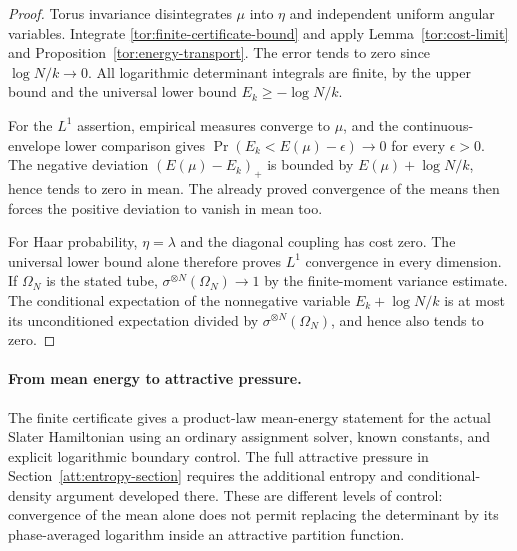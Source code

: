 \begin{proof}
Torus invariance disintegrates $\mu$ into $\eta$ and independent uniform
angular variables. Integrate \eqref{tor:finite-certificate-bound} and
apply Lemma~\ref{tor:cost-limit} and
Proposition~\ref{tor:energy-transport}. The error tends to zero since
$\log N/k\to0$. All logarithmic determinant integrals are finite, by
the upper bound and the universal lower bound $E_k\ge-\log N/k$.

For the $L^1$ assertion, empirical measures converge to $\mu$, and the
continuous-envelope lower comparison gives
$\Pr(E_k<E(\mu)-\epsilon)\to0$ for every $\epsilon>0$.
The negative deviation $(E(\mu)-E_k)_+$ is bounded by
$E(\mu)+\log N/k$, hence tends to zero in mean. The already proved
convergence of the means then forces the positive deviation to vanish
in mean too.

For Haar probability, $\eta=\lambda$ and the diagonal coupling has
cost zero. The universal lower bound alone therefore proves $L^1$
convergence in every dimension. If $\Omega_N$ is the stated tube,
$\sigma^{\otimes N}(\Omega_N)\to1$ by the finite-moment variance
estimate. The conditional expectation of the nonnegative variable
$E_k+\log N/k$ is at most its unconditioned expectation divided by
$\sigma^{\otimes N}(\Omega_N)$, and hence also tends to zero.
\end{proof}

\paragraph{From mean energy to attractive pressure.}
The finite certificate gives a product-law mean-energy statement for the
actual Slater Hamiltonian using an ordinary assignment solver, known
constants, and explicit logarithmic boundary control. The full attractive
pressure in Section~\ref{att:entropy-section} requires the additional
entropy and conditional-density argument developed there. These are
different levels of control: convergence of the mean alone does not
permit replacing the determinant by its phase-averaged logarithm inside
an attractive partition function.
